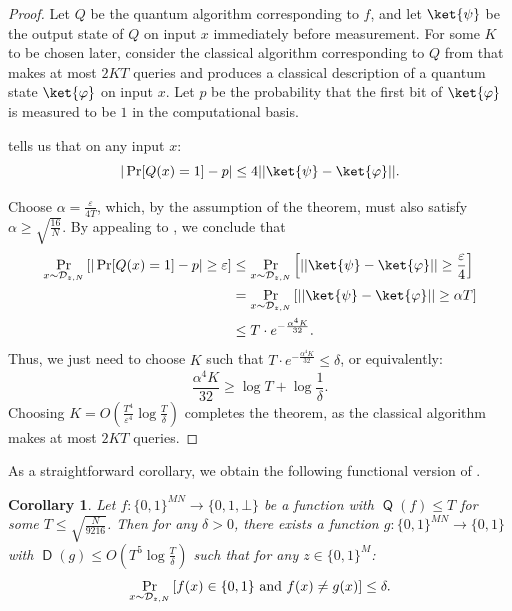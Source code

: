 \documentclass[10pt,a4paper]{article}
\newtheorem{corollary}[theorem]{Corollary}
\newcommand{\eps}{\varepsilon}
\DeclareMathOperator{\D}{\mathsf{D}}
\DeclareMathOperator{\Q}{\mathsf{Q}}
\begin{document}
\begin{proof}
Let $Q$ be the quantum algorithm corresponding to $f$, and let $\ket{\psi}$ be the output state of $Q$ on input $x$ immediately before measurement. For some $K$ to be chosen later, consider the classical algorithm corresponding to $Q$ from  that makes at most $2KT$ queries and produces a classical description of a quantum state $\ket{\varphi}$ on input $x$. Let $p$ be the probability that the first bit of $\ket{\varphi}$ is measured to be $1$ in the computational basis.

\cite[Lemma 3.6]{BV97} tells us that on any input $x$:
\[
|\Pr[Q(x) = 1] - p| \le 4|| \ket{\psi} - \ket{\varphi}||.
\]

Choose $\alpha = \frac{\eps}{4T}$, which, by the assumption of the theorem, must also satisfy $\alpha \ge \sqrt{\frac{16}{N}}$. By appealing to , we conclude that
\begin{align*}
\Pr_{x \sim \mathcal{D}_{z,N}}\left[|\Pr[Q(x) = 1] - p| \ge \eps\right] &\le \Pr_{x \sim \mathcal{D}_{z,N}}\left[|| \ket{\psi} - \ket{\varphi}|| \ge \frac{\eps}{4} \right]\\
&= \Pr_{x \sim \mathcal{D}_{z,N}}\left[|| \ket{\psi} - \ket{\varphi}|| \ge \alpha T \right]\\
&\le T \cdot e^{-\frac{\alpha^4 K}{32}}.
\end{align*}
Thus, we just need to choose $K$ such that $T \cdot e^{-\frac{\alpha^4 K}{32}} \le \delta$, or equivalently:
\[
\frac{\alpha^4 K}{32} \ge \log T + \log \frac{1}{\delta}.
\]
Choosing $K = O\left(\frac{T^4}{\eps^4} \log \frac{T}{\delta}\right)$ completes the theorem, as the classical algorithm makes at most $2KT$ queries.
\end{proof}

As a straightforward corollary, we obtain the following functional version of .

\begin{corollary}
\label{cor:sparse_aa_functional}
Let $f: \{0,1\}^{MN} \to \{0,1,\bot\}$ be a function with $\Q(f) \le T$ for some $T \le \sqrt{\frac{N}{9216}}$. Then for any $\delta > 0$, there exists a function $g: \{0,1\}^{MN} \to \{0,1\}$ with $\D(g) \le O\left(T^5 \log \frac{T}{\delta}\right)$ such that for any $z \in \{0,1\}^M$:
\[
\Pr_{x \sim \mathcal{D}_{z,N}}\left[f(x) \in \{0,1\} \text{\normalfont{ and }} f(x) \neq g(x)\right] \le \delta.
\]
\end{corollary}
\end{document}
